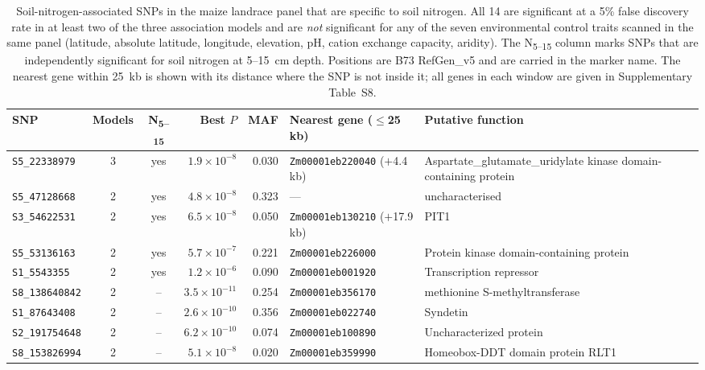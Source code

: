 \begin{table}[t]
\centering
\caption{Soil-nitrogen-associated SNPs in the maize landrace panel that are specific to soil nitrogen. All 14 are significant at a 5\% false discovery rate in at least two of the three association models and are \emph{not} significant for any of the seven environmental control traits scanned in the same panel (latitude, absolute latitude, longitude, elevation, pH, cation exchange capacity, aridity). The N\textsubscript{5--15} column marks SNPs that are independently significant for soil nitrogen at 5--15~cm depth. Positions are B73 RefGen\_v5 and are carried in the marker name. The nearest gene within 25~kb is shown with its distance where the SNP is not inside it; all genes in each window are given in Supplementary Table~S8.}
\label{tab:soilN_specific}
\footnotesize
\setlength{\tabcolsep}{4pt}
\begin{tabularx}{\textwidth}{@{}l c c r r l >{\raggedright\arraybackslash}X@{}}
\hline
SNP & Models & N\textsubscript{5--15} & Best $P$ & MAF & Nearest gene ($\le$25 kb) & Putative function \\
\hline
\texttt{S5\_22338979} & 3 & yes & $1.9\times10^{-8}$ & 0.030 & \texttt{Zm00001eb220040} ($+$4.4 kb) & Aspartate\_glutamate\_uridylate kinase domain-containing protein \\
\texttt{S5\_47128668} & 2 & yes & $4.8\times10^{-8}$ & 0.323 & --- & uncharacterised \\
\texttt{S3\_54622531} & 2 & yes & $6.5\times10^{-8}$ & 0.050 & \texttt{Zm00001eb130210} ($+$17.9 kb) & PIT1 \\
\texttt{S5\_53136163} & 2 & yes & $5.7\times10^{-7}$ & 0.221 & \texttt{Zm00001eb226000} & Protein kinase domain-containing protein \\
\texttt{S1\_5543355} & 2 & yes & $1.2\times10^{-6}$ & 0.090 & \texttt{Zm00001eb001920} & Transcription repressor \\
\texttt{S8\_138640842} & 2 & -- & $3.5\times10^{-11}$ & 0.254 & \texttt{Zm00001eb356170} & methionine S-methyltransferase \\
\texttt{S1\_87643408} & 2 & -- & $2.6\times10^{-10}$ & 0.356 & \texttt{Zm00001eb022740} & Syndetin \\
\texttt{S2\_191754648} & 2 & -- & $6.2\times10^{-10}$ & 0.074 & \texttt{Zm00001eb100890} & Uncharacterized protein \\
\texttt{S8\_153826994} & 2 & -- & $5.1\times10^{-8}$ & 0.020 & \texttt{Zm00001eb359990} & Homeobox-DDT domain protein RLT1 \\

\end{tabularx}
\end{table}
